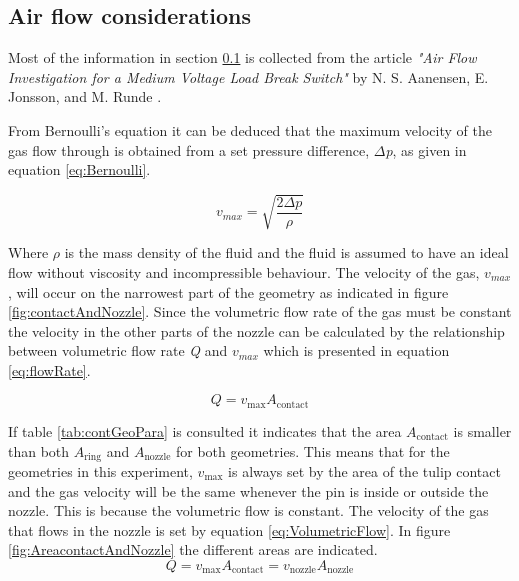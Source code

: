 \documentclass[10pt,a4paper,twoside]{article}
\begin{document}
\subsection{Air flow considerations} \label{sec:AirFlow}
 Most of the information in section \ref{sec:AirFlow} is collected from the article \textit{"Air Flow Investigation for a Medium Voltage Load Break Switch"} by N. S. Aanensen, E. Jonsson, and M. Runde \cite{bib:AFIMVLBA}. \newline

From Bernoulli's equation it can be deduced that the maximum velocity of the gas flow through is obtained from a set pressure difference, $\Delta$\textit{p}, as given in equation \eqref{eq:Bernoulli}.

\begin{equation} \label{eq:Bernoulli}
v_{max}=\sqrt{ \frac{2 \Delta p}{\rho}}
\end{equation}

Where $\rho$ is the mass density of the fluid and the fluid is assumed to have an ideal flow without viscosity and incompressible behaviour. The velocity of the gas, $v_{max}$, will occur on the narrowest part of the geometry as indicated in figure \ref{fig:contactAndNozzle}. Since the volumetric flow rate of the gas must be constant the velocity in the other parts of the nozzle can be calculated by the relationship between volumetric flow rate \textit{Q} and $v_{max}$ which is presented in equation \eqref{eq:flowRate}.

\begin{equation} \label{eq:flowRate}
Q=v_{\mathrm{max}} A_\mathrm{{contact}}
\end{equation} 

If table \ref{tab:contGeoPara} is consulted it indicates that the area $ A_\mathrm{{contact}}$ is smaller than both $A_\mathrm{{ring}}$ and $A_\mathrm{{nozzle}}$ for both geometries. This means that for the geometries in this experiment, $v_\mathrm{{max}}$ is always set by the area of the tulip contact and the gas velocity will be the same whenever the pin is inside or outside the nozzle. This is because the volumetric flow is constant. The velocity of the gas that flows in the nozzle is set by equation \eqref{eq:VolumetricFlow}. In figure \ref{fig:AreacontactAndNozzle} the different areas are indicated.
\begin{equation*}
Q=v_\mathrm{{max}} A_\mathrm{{contact}} = v_\mathrm{{nozzle}} A_\mathrm{{nozzle}}
\end{equation*}
\end{document}
